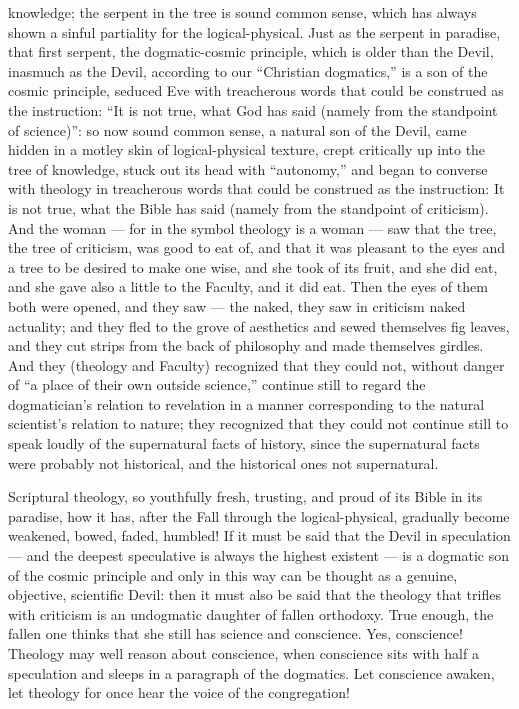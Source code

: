 \documentclass[12pt]{book}
\newcommand{\opage}[1]{\marginnote{\footnotesize\textit{[#1]}}}
\begin{document}
knowledge; the serpent in the tree is sound common sense, which has always shown a sinful partiality for the logical-physical. Just as the serpent in paradise, that first serpent, the dogmatic-cosmic principle, which is older than the Devil, inasmuch as the Devil, according to our ``Christian dogmatics,'' is a son of the cosmic principle, seduced Eve with treacherous words that could be construed as the instruction: ``It is not true, what God has said (namely from the standpoint of science)'': so now sound common sense, a natural son of the Devil, came hidden in a motley skin of logical-physical texture, crept critically up into the tree of knowledge, stuck out its head with ``autonomy,'' and began to converse with theology in treacherous words that could be construed as the instruction: It is not true, what the Bible has said (namely from the standpoint of criticism). And the woman --- for in the symbol theology is a woman --- saw that the tree, the tree of criticism, was good to eat of, and that it was pleasant to the eyes and a tree to be desired to make one wise, and she took of its fruit, and she did eat, and she gave also a little to the Faculty, and it did eat. Then the eyes of them both were opened, and they saw --- the naked, they saw in criticism naked actuality; and they fled to the grove of aesthetics and sewed themselves fig leaves, and they cut strips from the back of philosophy and made themselves girdles. And they (theology and Faculty) recognized that they could not, without danger of ``a place of their own outside science,'' continue still to regard the dogmatician's relation to revelation in a manner corresponding to the natural scientist's relation to nature; they recognized that they could not continue still to speak loudly of the supernatural facts of history, since the supernatural facts were probably not historical, and the historical ones not supernatural.

Scriptural theology, so youthfully fresh, trusting, and proud of its Bible in its paradise, how it has, after the Fall through the logical-physical, gradually become weakened, bowed, faded,
\opage{49}\setcounter{footnote}{0}%
humbled! If it must be said that the Devil in speculation --- and the deepest speculative is always the highest existent --- is a dogmatic son of the cosmic principle and only in this way can be thought as a genuine, objective, scientific Devil: then it must also be said that the theology that trifles with criticism is an undogmatic daughter of fallen orthodoxy. True enough, the fallen one thinks that she still has science and conscience. Yes, conscience! Theology may well reason about conscience, when conscience sits with half a speculation and sleeps in a paragraph of the dogmatics. Let conscience awaken, let theology for once hear the voice of the congregation!
\end{document}
